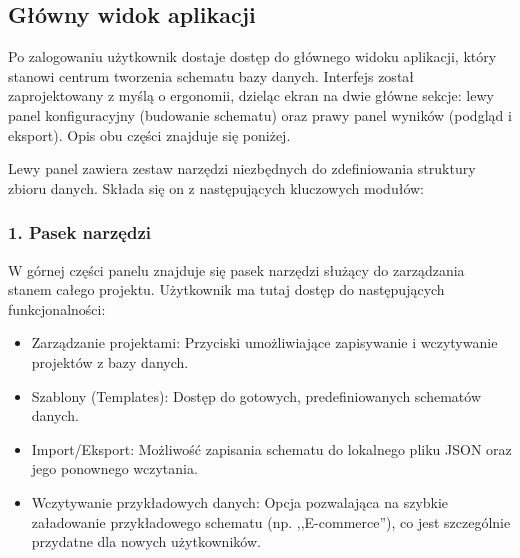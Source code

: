 \subsection*{Główny widok aplikacji}
Po zalogowaniu użytkownik dostaje dostęp do głównego widoku aplikacji, który stanowi centrum tworzenia schematu bazy danych. Interfejs został zaprojektowany z myślą o ergonomii, dzieląc ekran na dwie główne sekcje: lewy panel konfiguracyjny (budowanie schematu) oraz prawy panel wyników (podgląd i eksport). Opis obu części znajduje się poniżej.

Lewy panel zawiera zestaw narzędzi niezbędnych do zdefiniowania struktury zbioru danych. Składa się on z następujących kluczowych modułów:

\subsubsection*{1. Pasek narzędzi}
W górnej części panelu znajduje się pasek narzędzi służący do zarządzania stanem całego projektu. Użytkownik ma tutaj dostęp do następujących funkcjonalności:
\begin{itemize}
    \item Zarządzanie projektami: Przyciski umożliwiające zapisywanie i wczytywanie projektów z bazy danych.
    \item Szablony (Templates): Dostęp do gotowych, predefiniowanych schematów danych.
    \item Import/Eksport: Możliwość zapisania schematu do lokalnego pliku \gls{JSON} oraz jego ponownego wczytania.
    \item Wczytywanie przykładowych danych: Opcja pozwalająca na szybkie załadowanie przykładowego schematu (np. ,,E-commerce''), co jest szczególnie przydatne dla nowych użytkowników.
\end{itemize}

